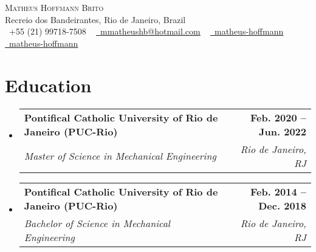 \documentclass[letterpaper,11pt]{article}
\makeatletter
\newcommand{\resumeSubheading}[4]{
  \vspace{-2pt}\item
    \begin{tabular*}{1.0\textwidth}[t]{l@{\extracolsep{\fill}}r}
      \textbf{#1} & \textbf{\small #2} \\
      \textit{\small#3} & \textit{\small #4} \\
    \end{tabular*}\vspace{-7pt}
}
\newcommand{\resumeSubHeadingListStart}{\begin{itemize}[leftmargin=0.0in, label={}]}
\newcommand{\resumeSubHeadingListEnd}{\end{itemize}}
\makeatother
\begin{document}

\begin{center}
    {\Huge \scshape Matheus Hoffmann Brito} \\ \vspace{1pt}
    Recreio dos Bandeirantes, Rio de Janeiro, Brazil \\ \vspace{1pt}
    \small \raisebox{-0.1\height}\faPhone\ +55 (21) 99718-7508 ~ \href{mailto:mmatheushb@hotmail.com}{\raisebox{-0.2\height}\faEnvelope\  \underline{mmatheushb@hotmail.com}} ~ 
    \href{https://linkedin.com/in/matheus-hoffmann}{\raisebox{-0.2\height}\faLinkedin\ \underline{matheus-hoffmann}}  ~
    \href{https://github.com/matheus-hoffmann}{\raisebox{-0.2\height}\faGithub\ \underline{matheus-hoffmann}}
    \vspace{-8pt}
\end{center}


\section{Education}
\resumeSubHeadingListStart
\resumeSubheading
{Pontifical Catholic University of Rio de Janeiro (PUC-Rio)}{Feb. 2020 -- Jun. 2022}
{Master of Science in Mechanical Engineering}{Rio de Janeiro, RJ}
\resumeSubheading
{Pontifical Catholic University of Rio de Janeiro (PUC-Rio)}{Feb. 2014 -- Dec. 2018}
{Bachelor of Science in Mechanical Engineering}{Rio de Janeiro, RJ}
\resumeSubHeadingListEnd


\end{document}
